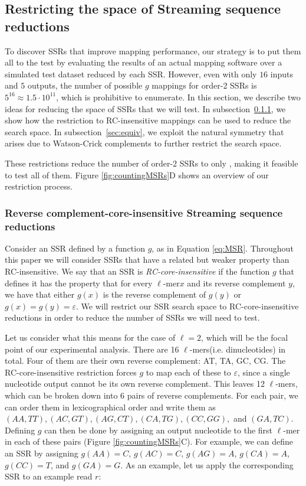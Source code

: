 \documentclass[
  11pt,
  twoside]{scrbook}
\begin{document}
\hypertarget{sec:enum}{%
\subsection{Restricting the space of Streaming sequence reductions}\label{sec:enum}}

To discover SSRs that improve mapping performance, our strategy is to put them
all to the test by evaluating the results of an actual mapping software over a
simulated test dataset reduced by each SSR. However, even with only \(16\) inputs
and \(5\) outputs, the number of possible \(g\) mappings for order-2 SSRs is
\(5^{16}\approx 1.5\cdot10^{11}\), which is prohibitive to enumerate. In this
section, we describe two ideas for reducing the space of SSRs that we will test.
In subsection~\ref{sec:rc-insensitive}, we show how the restriction to
RC-insensitive mappings can be used to reduce the search space. In
subsection~\ref{sec:equiv}, we exploit the natural symmetry that arises due to
Watson-Crick complements to further restrict the search space.

These restrictions reduce the number of order-2 SSRs to only , making it
feasible to test all of them. Figure \ref{fig:countingMSRs}D shows an overview
of our restriction process.

\hypertarget{sec:rc-insensitive}{%
\subsubsection{Reverse complement-core-insensitive Streaming sequence reductions}\label{sec:rc-insensitive}}

Consider an SSR defined by a function \(g\), as in Equation \eqref{eq:MSR}.
Throughout this paper we will consider SSRs that have a related but weaker
property than RC-insensitive. We say that an SSR is \emph{RC-core-insensitive} if the
function \(g\) that defines it has the property that for every \(\ell\)-mer\(x\) and
its reverse complement \(y\), we have that either \(g(x)\) is the reverse complement
of \(g(y)\) or \(g(x) = g(y) = \varepsilon\). We will restrict our SSR search space
to RC-core-insensitive reductions in order to reduce the number of SSRs we will
need to test.

Let us consider what this means for the case of \(\ell=2\), which will be the
focal point of our experimental analysis. There are 16 \(\ell\)-mers(i.e.
dinucleotides) in total. Four of them are their own reverse complement: AT, TA,
GC, CG. The RC-core-insensitive restriction forces \(g\) to map each of these to
\(\varepsilon\), since a single nucleotide output cannot be its own reverse
complement. This leaves 12 \(\ell\)-mers, which can be broken down into 6 pairs of
reverse complements. For each pair, we can order them in lexicographical order
and write them as \((AA,TT), (AC,GT), (AG,CT), (CA,TG), (CC,GG),\) and \((GA,TC)\).
Defining \(g\) can then be done by assigning an output nucleotide to the first
\(\ell\)-mer in each of these pairs (Figure \ref{fig:countingMSRs}C). For
example, we can define an SSR by assigning \(g(AA) = C\), \(g(AC) = C\),
\(g(AG) = A\), \(g(CA) = A\), \(g(CC) = T\), and \(g(GA) = G\). As an example, let us
apply the corresponding SSR to an example read \(r\):
\end{document}
